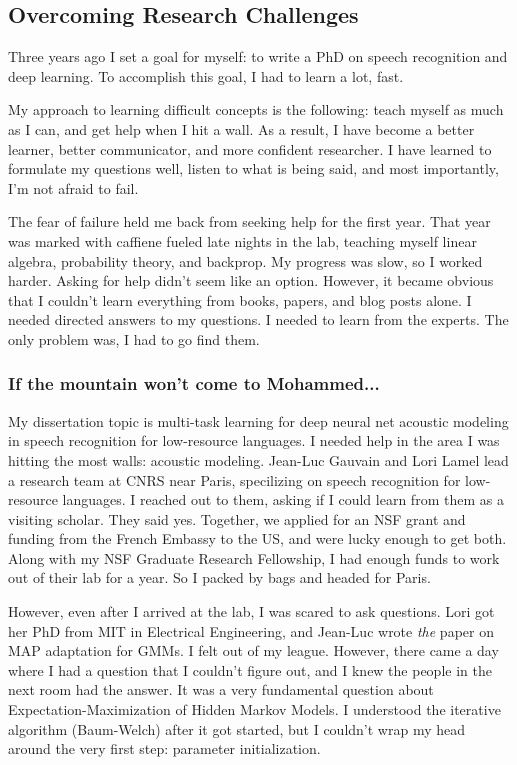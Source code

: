 \documentclass[12pt,a4paper]{article}
\begin{document}
\subsection*{Overcoming Research Challenges}

Three years ago I set a goal for myself: to write a PhD on speech recognition and deep learning. To accomplish this goal, I had to learn a lot, fast.

My approach to learning difficult concepts is the following: teach myself as much as I can, and get help when I hit a wall. As a result, I have become a better learner, better communicator, and more confident researcher. I have learned to formulate my questions well, listen to what is being said, and most importantly, I'm not afraid to fail.

The fear of failure held me back from seeking help for the first year. That year was marked with caffiene fueled late nights in the lab, teaching myself linear algebra, probability theory, and backprop. My progress was slow, so I worked harder. Asking for help didn't seem like an option. However, it became obvious that I couldn't learn everything from books, papers, and blog posts alone. I needed directed answers to my questions. I needed to learn from the experts. The only problem was, I had to go find them.

\subsubsection*{If the mountain won't come to Mohammed...}

My dissertation topic is multi-task learning for deep neural net acoustic modeling in speech recognition for low-resource languages. I needed help in the area I was hitting the most walls: acoustic modeling. Jean-Luc Gauvain and Lori Lamel lead a research team at CNRS near Paris, specilizing on speech recognition for low-resource languages. I reached out to them, asking if I could learn from them as a visiting scholar. They said yes. Together, we applied for an NSF grant and funding from the French Embassy to the US, and were lucky enough to get both. Along with my NSF Graduate Research Fellowship, I had enough funds to work out of their lab for a year. So I packed by bags and headed for Paris.

However, even after I arrived at the lab, I was scared to ask questions. Lori got her PhD from MIT in Electrical Engineering, and Jean-Luc wrote \textit{the} paper on MAP adaptation for GMMs. I felt out of my league. However, there came a day where I had a question that I couldn't figure out, and I knew the people in the next room had the answer. It was a very fundamental question about Expectation-Maximization of Hidden Markov Models. I understood the iterative algorithm (Baum-Welch) after it got started, but I couldn't wrap my head around the very first step: parameter initialization.
\end{document}
